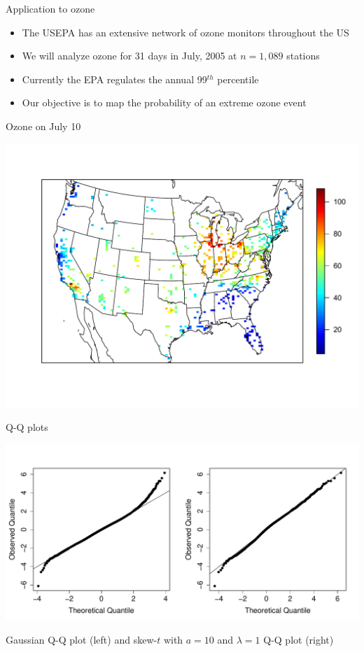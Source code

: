 \documentclass{beamer}
\begin{document}
 \begin{frame}{Application to ozone}
 	\begin{itemize}\setlength\itemsep{1em}
 	\item The USEPA has an extensive network of ozone monitors throughout the US
 	\item We will analyze ozone for 31 days in July, 2005 at $n=1,089$ stations
 	\item Currently the EPA regulates the annual 99$^{th}$ percentile
 	\item Our objective is to map the probability of an extreme ozone event
 	\end{itemize}
 \end{frame}

 \begin{frame}{Ozone on July 10}
 	\begin{center}
 		\includegraphics[width=1.2\textheight]{ozone-10jul-us}
 	\end{center}
 \end{frame}

 \begin{frame}{Q-Q plots}
 	\begin{center}
 		\includegraphics[width=0.9\textheight]{qq-res}

 		Gaussian Q-Q plot (left) and skew-$t$ with $a = 10$ and $\lambda = 1$ Q-Q plot (right)
 	\end{center}
 \end{frame}
\end{document}

